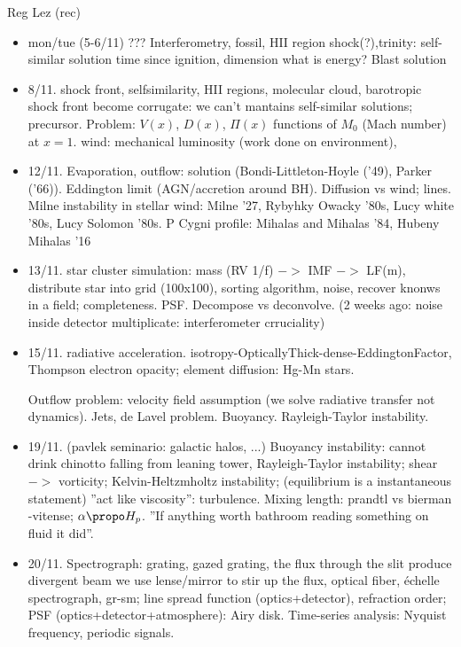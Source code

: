 \begin{frame}[allowframebreaks]{Reg Lez (rec)}
\begin{itemize}
\item mon/tue (5-6/11) ???
Interferometry, fossil, HII region shock(?),trinity: self-similar solution time since ignition, dimension what is energy?
Blast solution

\item 8/11. shock front, selfsimilarity, HII regions, molecular cloud, barotropic shock front become corrugate: we can't mantains self-similar solutions; precursor. Problem: $V(x)$, $D(x)$, $\Pi(x)$ functions of $M_0$ (Mach number) at $x=1$.
wind: mechanical luminosity (work done on environment),

\item 12/11. Evaporation, outflow: solution (Bondi-Littleton-Hoyle ('49), Parker ('66)). Eddington limit (AGN/accretion around BH). Diffusion vs wind; lines. Milne instability in stellar wind: Milne '27, Rybyhky Owacky '80s, Lucy white '80s, Lucy Solomon '80s. P Cygni profile: Mihalas and Mihalas '84, Hubeny Mihalas '16

\item 13/11. star cluster simulation: mass (RV 1/f) $->$ IMF $->$ LF(m), distribute star into grid (100x100), sorting algorithm, noise, recover knonws in a field; completeness. PSF. Decompose vs deconvolve. (2 weeks ago: noise inside detector multiplicate: interferometer   crruciality)

\item 15/11. radiative acceleration. isotropy-OpticallyThick-dense-EddingtonFactor, Thompson electron opacity; element diffusion: Hg-Mn stars.

Outflow problem: velocity field assumption (we solve radiative transfer not dynamics). 
Jets, de Lavel problem. Buoyancy. Rayleigh-Taylor instability.

\item 19/11. (pavlek seminario: galactic halos, ...) Buoyancy instability: cannot drink chinotto falling from leaning tower, Rayleigh-Taylor instability; shear $->$ vorticity; Kelvin-Heltzmholtz instability; (equilibrium is a instantaneous statement) ''act like viscosity'': turbulence. Mixing length: prandtl vs bierman -vitense; $\alpha\propo H_p$. ''If anything worth bathroom reading something on fluid it did''.

\item 20/11. Spectrograph: grating, gazed grating, the flux through the slit produce divergent beam \so{} we use lense/mirror to stir up the flux, optical fiber, \'echelle spectrograph, gr-sm; line spread function (optics+detector), refraction order; PSF (optics+detector+atmosphere): Airy disk. Time-series analysis: Nyquist frequency, periodic signals.


\end{itemize}
\end{frame}
